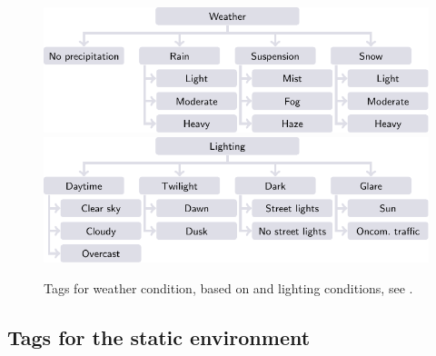\begin{figure}[t!]
	\centering
	\includegraphics{figures/weather}\\
	\vspace{0.5em}
	\includegraphics{figures/lighting}
	\caption{Tags for weather condition, based on \cite{mahmassani2012use} and lighting conditions, see \cite{golob2003relationships}.}
	\label{fig:conditions}
\end{figure}




%
%



\subsection{Tags for the static environment}
\label{sec:tags selection static}

